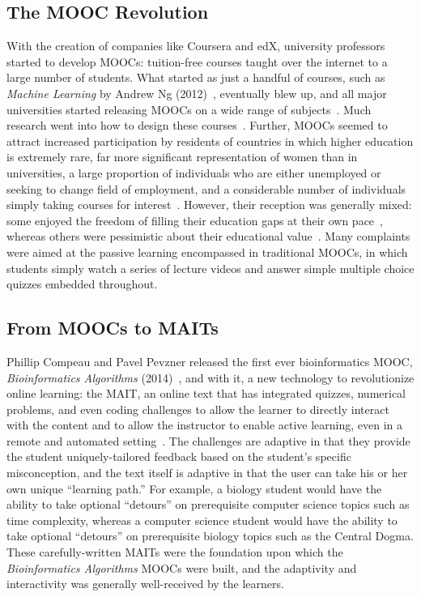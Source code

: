 \subsection{The MOOC Revolution}
With the creation of companies like Coursera and edX, university professors started to develop \glspl{MOOC}: tuition-free courses taught over the internet to a large number of students. What started as just a handful of courses, such as \textit{Machine Learning} by Andrew Ng (2012)~\cite{Ng2012}, eventually blew up, and all major universities started releasing \glspl{MOOC} on a wide range of subjects~\cite{Pappano2012}. Much research went into how to design these courses~\cite{Guardia2013,Bruff2013,Breslow2013,Guo2014}. Further, \glspl{MOOC} seemed to attract increased participation by residents of countries in which higher education is extremely rare, far more significant representation of women than in universities, a large proportion of individuals who are either unemployed or seeking to change field of employment, and a considerable number of individuals simply taking courses for interest~\cite{Bayeck2016}. However, their reception was generally mixed: some enjoyed the freedom of filling their education gaps at their own pace~\cite{Milligan2017}, whereas others were pessimistic about their educational value~\cite{Vardi2012}. Many complaints were aimed at the passive learning encompassed in traditional \glspl{MOOC}, in which students simply watch a series of lecture videos and answer simple multiple choice quizzes embedded throughout.

\subsection{From MOOCs to MAITs}
Phillip Compeau and Pavel Pevzner released the first ever bioinformatics \gls{MOOC}, \textit{Bioinformatics Algorithms} (2014)~\cite{Compeau2014}, and with it, a new technology to revolutionize online learning: the \gls{MAIT}, an online text that has integrated quizzes, numerical problems, and even coding challenges to allow the learner to directly interact with the content and to allow the instructor to enable active learning, even in a remote and automated setting~\cite{Compeau2015}. The challenges are adaptive in that they provide the student uniquely-tailored feedback based on the student's specific misconception, and the text itself is adaptive in that the user can take his or her own unique ``learning path.'' For example, a biology student would have the ability to take optional ``detours'' on prerequisite computer science topics such as time complexity, whereas a computer science student would have the ability to take optional ``detours'' on prerequisite biology topics such as the Central Dogma. These carefully-written \glspl{MAIT} were the foundation upon which the \textit{Bioinformatics Algorithms} \glspl{MOOC} were built, and the adaptivity and interactivity was generally well-received by the learners.

